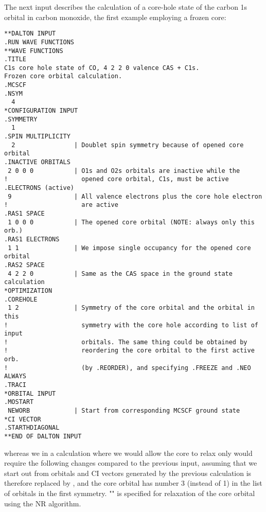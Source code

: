 \begin{center}
\end{center}

The next input describes the calculation of a core-hole
state of the carbon 1s orbital in carbon monoxide, the first
example employing a frozen core:

\begin{verbatim}
**DALTON INPUT
.RUN WAVE FUNCTIONS
**WAVE FUNCTIONS
.TITLE
C1s core hole state of CO, 4 2 2 0 valence CAS + C1s.
Frozen core orbital calculation.
.MCSCF
.NSYM
  4
*CONFIGURATION INPUT
.SYMMETRY
  1
.SPIN MULTIPLICITY
  2                | Doublet spin symmetry because of opened core orbital
.INACTIVE ORBITALS
 2 0 0 0           | O1s and O2s orbitals are inactive while the
!                    opened core orbital, C1s, must be active
.ELECTRONS (active)
 9                 | All valence electrons plus the core hole electron
!                    are active
.RAS1 SPACE
 1 0 0 0           | The opened core orbital (NOTE: always only this orb.)
.RAS1 ELECTRONS
 1 1               | We impose single occupancy for the opened core orbital
.RAS2 SPACE
 4 2 2 0           | Same as the CAS space in the ground state calculation
*OPTIMIZATION
.COREHOLE
 1 2               | Symmetry of the core orbital and the orbital in this
!                    symmetry with the core hole according to list of input
!                    orbitals. The same thing could be obtained by
!                    reordering the core orbital to the first active orb.
!                    (by .REORDER), and specifying .FREEZE and .NEO ALWAYS
.TRACI
*ORBITAL INPUT
.MOSTART
 NEWORB            | Start from corresponding MCSCF ground state
*CI VECTOR
.STARTHDIAGONAL
**END OF DALTON INPUT
\end{verbatim}
\label{sirius_ex6}


whereas we in a calculation where we would allow the core to
relax only would require the following changes
compared to the previous input, assuming that we start out from
orbitals and CI vectors generated by the previous calculation
 is therefore replaced by , and
the core orbital has number 3 (instead of 1) in the list of
orbitals in the first symmetry. "" is specified for
relaxation of the core orbital using the NR algorithm.

